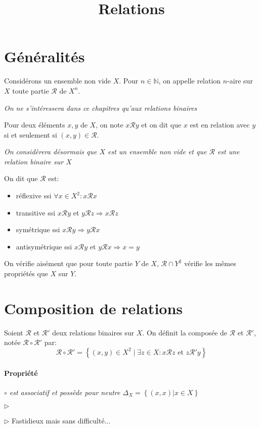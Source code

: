 \documentclass{scrartcl}
\title{Relations}
\author{}
\date{}
\begin{document}
	\maketitle
	\section{Généralités}
		Considérons un ensemble non vide $X$. Pour $n\in\mathbb{N}$, on appelle relation $n$-aire sur $X$
		toute partie $\mathcal{R}$ de $X^n$. 

		\begin{center}\textit{On ne s'intéressera dans ce chapitres qu'aux relations binaires}\end{center}

		Pour deux éléments $x,y$ de $X$, on note $x\mathcal{R}y$ et on dit que $x$ est en relation avec $y$ si et seulement si
		$(x,y)\in \mathcal{R}$.

		\begin{center}\textit{On considèrera désormais que $X$ est un ensemble non vide et que $\mathcal{R}$ est une relation binaire sur $X$}\end{center}

		On dit que $\mathcal{R}$ est:
		\begin{itemize}
			\item réflexive ssi $\forall x \in X^2: x\mathcal{R}x$
			\item transitive ssi $x\mathcal{R}y$ et $y\mathcal{R}z \Rightarrow x\mathcal{R}z$
			\item symétrique ssi $x\mathcal{R}y \Rightarrow y\mathcal{R}x$
			\item antisymétrique ssi $x\mathcal{R}y$ et $y\mathcal{R}x \Rightarrow x = y$ 
		\end{itemize}

		On vérifie aisément que pour toute partie $Y$ de $X$, $\mathcal{R}\cap Y^2$ vérifie les mêmes propriétés que $X$ sur $Y$.

	\section{Composition de relations}
		Soient $\mathcal{R}$ et $\mathcal{R}'$ deux relations binaires sur $X$. 
		On définit la composée de $\mathcal{R}$ et $\mathcal{R}'$, notée $\mathcal{R} \circ \mathcal{R}'$ par:
		\[
			\mathcal{R}\circ\mathcal{R}' = \left\{(x,y) \in X^2 \; \big| \; \exists z \in X: x\mathcal{R}z \text{ et } z\mathcal{R}'y \right\}
		\]
		
		\paragraph{Propriété} \textsl{$\circ$ est associatif et possède pour neutre $\Delta_X = \left\{(x,x) \big| x\in X\right\}$}
		\begin{labeling}{$\triangleright$}
			\item [$\triangleright$] Fastidieux mais sans difficulté...
		\end{labeling}
\end{document}
